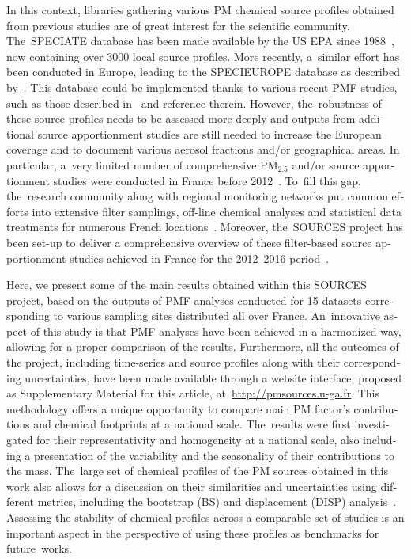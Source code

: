 \begin{otherlanguage}{english}
In this context, libraries gathering various PM chemical source profiles obtained from
previous studies are of great interest for the scientific community. The~SPECIATE database
has been made available by the US EPA since 1988~\autocite{simonDevelopment2010}, now
containing over 3000 local source profiles. More recently, a~similar effort has been
conducted in Europe, leading to the SPECIEUROPE database as described
by~\textcite{pernigottiSPECIEUROPE2016}.  This database could be implemented thanks to
various recent PMF studies, such as those described
in~\textcite{vianaSource2008,belisCritical2013,karagulianContributions2015,mooibroekPM102016,perronePM2016}
and reference therein.  However, the~robustness of these source profiles needs to be
assessed more deeply and outputs from additional source apportionment studies are still
needed to increase the European coverage and to document various aerosol fractions and/or
geographical areas.  In particular, a~very limited number of comprehensive PM$_{2.5}$
and/or \PM{} source apportionment studies were conducted in France before
2012~\autocite{elhaddadPrimary2011,elhaddadInsights2011,bressiSources2014,wakedSource2014}.
To~fill this gap, the~research community along with regional monitoring networks put
common efforts into extensive filter samplings, off-line chemical analyses and statistical
data treatments for numerous French locations~\autocite{amodeoProgrammes2017}.  Moreover,
the~SOURCES project has been set-up to deliver a comprehensive overview of these
filter-based source apportionment studies achieved in France for the 2012--2016
period~\autocite{favezEtat2017}.

Here, we present some of the main results obtained within this SOURCES project, based on
the outputs of PMF analyses conducted for 15 datasets corresponding to various sampling
sites distributed all over France. An~innovative aspect of this study is that PMF analyses
have been achieved in a harmonized way, allowing for a proper comparison of the results.
Furthermore, all the outcomes of the project, including time-series and source profiles
along with their corresponding uncertainties, have been made available through a website
interface, proposed as Supplementary Material for this article,
at~\url{http://pmsources.u-ga.fr}. This methodology offers a unique opportunity to compare
main PM factor's contributions and chemical footprints at a national scale. The~results
were first investigated for their representativity and homogeneity at a national scale,
also including a presentation of the variability and the seasonality of their
contributions to the \PM{} mass. The~large set of chemical profiles of the PM sources
obtained in this work also allows for a discussion on their similarities and uncertainties
using different metrics, including the bootstrap (BS) and displacement (DISP)
analysis~\autocite{paateroMethods2014}. Assessing the stability of chemical profiles
across a comparable set of studies is an important aspect in the perspective of using
these profiles as benchmarks for future~works.


\end{otherlanguage}
